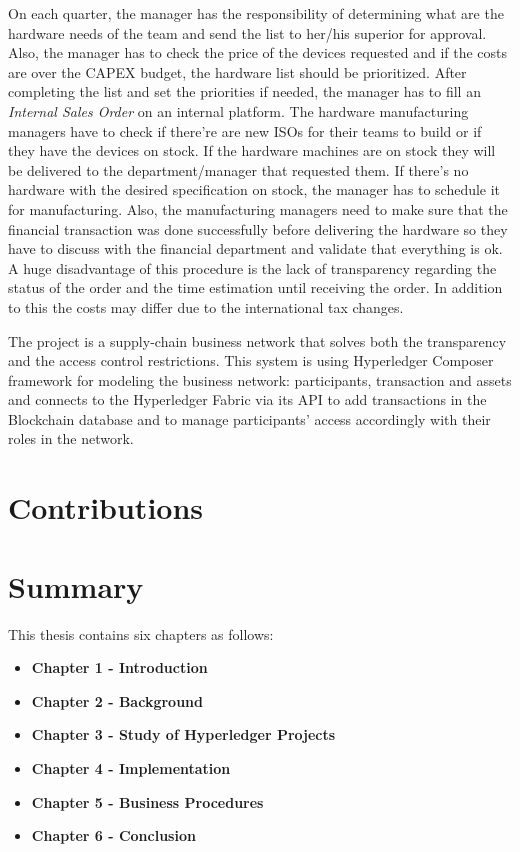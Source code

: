 On each quarter, the manager has the responsibility of determining what are the hardware needs of the team and send the list to her/his superior for approval.
Also, the manager has to check the price of the devices requested and if the costs are over the CAPEX budget, the hardware list should be prioritized. 
After completing the list and set the priorities if needed, the manager has to fill an \emph{Internal Sales Order} on an internal platform. 
The hardware manufacturing managers have to check if there're are new ISOs for their teams to build or if they have the devices on stock. If the hardware machines are on stock they will be delivered to the department/manager that requested them. If there's no hardware with the desired specification on stock, the manager has to schedule it for manufacturing.
Also, the manufacturing managers need to make sure that the financial transaction was done successfully before delivering the hardware so they have to discuss with the financial department and validate that everything is ok.
A huge disadvantage of this procedure is the lack of transparency regarding the status of the order and the time estimation until receiving the order.
In addition to this the costs may differ due to the international tax changes. 

The \textbf{\emph{{\project}}} project is a supply-chain business network that solves both the transparency and the access control restrictions.
This system is using Hyperledger Composer framework for modeling the business network: participants, transaction and assets and connects to the Hyperledger Fabric via its API to add transactions in the Blockchain database and to manage participants' access accordingly with their roles in the network.

\section{Contributions}
\label{sec:intro-sec3}

\section{Summary}
\label{sec:intro-sec4}
This thesis contains six chapters as follows:
\begin{itemize}
	\item \textbf{Chapter 1 - Introduction}
	\item \textbf{Chapter 2 - Background}
	\item \textbf{Chapter 3 - Study of Hyperledger Projects}
	\item \textbf{Chapter 4 - Implementation}
	\item \textbf{Chapter 5 - Business Procedures}
	\item \textbf{Chapter 6 - Conclusion}
\end{itemize}















